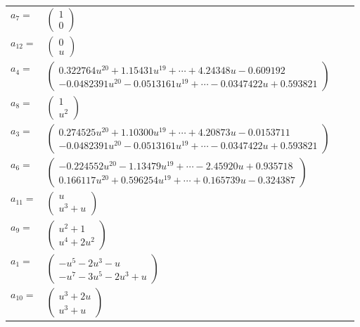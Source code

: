 \documentclass[1p]{elsarticle_modified}
\theoremstyle{definition}
\begin{document}
\begin{tabular}{m{7pt} m{180pt} m{7pt} m{180pt} }
\flushright $a_{7}=$&$\begin{pmatrix}1\\0\end{pmatrix}$ \\
\flushright $a_{12}=$&$\begin{pmatrix}0\\u\end{pmatrix}$ \\
\flushright $a_{4}=$&$\begin{pmatrix}0.322764 u^{20}+1.15431 u^{19}+\cdots+4.24348 u-0.609192\\-0.0482391 u^{20}-0.0513161 u^{19}+\cdots-0.0347422 u+0.593821\end{pmatrix}$ \\
\flushright $a_{8}=$&$\begin{pmatrix}1\\u^2\end{pmatrix}$ \\
\flushright $a_{3}=$&$\begin{pmatrix}0.274525 u^{20}+1.10300 u^{19}+\cdots+4.20873 u-0.0153711\\-0.0482391 u^{20}-0.0513161 u^{19}+\cdots-0.0347422 u+0.593821\end{pmatrix}$ \\
\flushright $a_{6}=$&$\begin{pmatrix}-0.224552 u^{20}-1.13479 u^{19}+\cdots-2.45920 u+0.935718\\0.166117 u^{20}+0.596254 u^{19}+\cdots+0.165739 u-0.324387\end{pmatrix}$ \\
\flushright $a_{11}=$&$\begin{pmatrix}u\\u^3+u\end{pmatrix}$ \\
\flushright $a_{9}=$&$\begin{pmatrix}u^2+1\\u^4+2 u^2\end{pmatrix}$ \\
\flushright $a_{1}=$&$\begin{pmatrix}- u^5-2 u^3- u\\- u^7-3 u^5-2 u^3+u\end{pmatrix}$ \\
\flushright $a_{10}=$&$\begin{pmatrix}u^3+2 u\\u^3+u\end{pmatrix}$ \\

\end{tabular}
\end{document}
